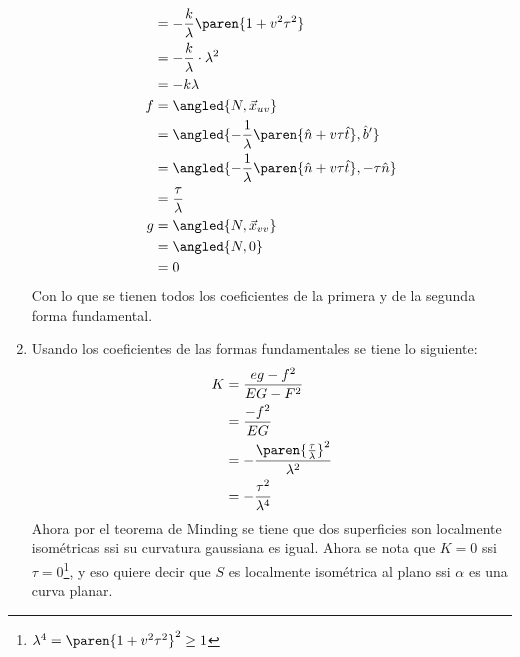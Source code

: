 \documentclass{homework}
\begin{document}
\begin{sol}
\begin{enumerate}
\begin{align*}
                    & =-\frac{k}\lambda\paren{1+v^2\tau^2}                                                                                                      \\
                    & =-\frac{k}\lambda\cdot\lambda^2                                                                                                           \\
                    & =-k\lambda                                                                                                                                \\
                  f & =\angled{N,\vec{x}_{uv}}                                                                                                                  \\
                    & =\angled{-\frac1\lambda\paren{\hat{n}+v\tau\hat{t}},\hat{b}'}                                                                             \\
                    & =\angled{-\frac1\lambda\paren{\hat{n}+v\tau\hat{t}},-\tau\hat{n}}                                                                         \\
                    & =\frac\tau\lambda                                                                                                                         \\
                  g & =\angled{N,\vec{x}_{vv}}                                                                                                                  \\
                    & =\angled{N,0}                                                                                                                             \\
                    & =0                                                                                                                                        \\
              \end{align*}
              Con lo que se tienen todos los coeficientes de la primera y de la segunda forma fundamental.
        \item Usando los coeficientes de las formas fundamentales se tiene lo siguiente:
              \begin{align*}
                  K & =\frac{eg-f^2}{EG-F^2}                         \\
                    & =\frac{-f^2}{EG}                               \\
                    & =-\frac{\paren{\frac\tau\lambda}^2}{\lambda^2} \\
                    & =-\frac{\tau^2}{\lambda^4}
              \end{align*}
              Ahora por el teorema de Minding se tiene que dos superficies son localmente isométricas ssi su curvatura gaussiana es igual. Ahora se nota que \(K=0\) ssi \(\tau=0\)\footnote{\(\lambda^4=\paren{1+v^2\tau^2}^2\geq1\)}, y eso quiere decir que \(S\) es localmente isométrica al plano ssi \(\alpha\) es una curva planar.
    \end{enumerate}
\end{sol}
\end{document}
